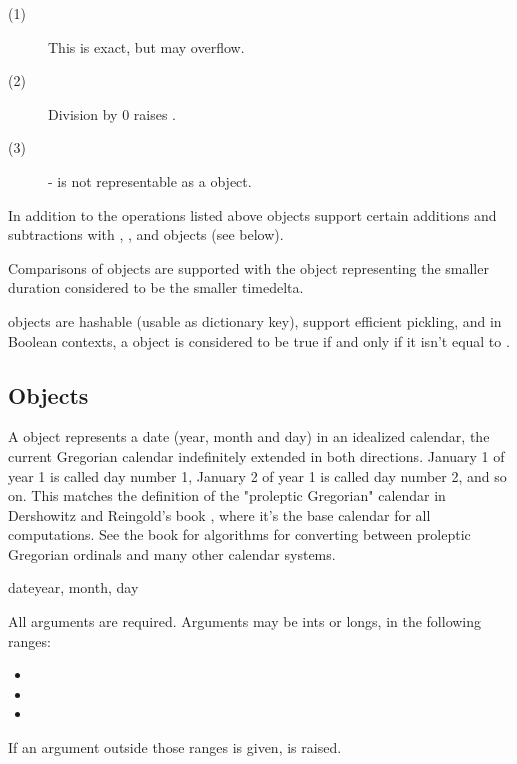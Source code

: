 \begin{description}
\item[(1)]
This is exact, but may overflow.

\item[(2)]
Division by 0 raises .

\item[(3)]
- is not representable as a  object.

\end{description}

In addition to the operations listed above  objects
support certain additions and subtractions with ,
, and  objects (see below).

Comparisons of  objects are supported with the
 object representing the smaller duration considered
to be the smaller timedelta.

 objects are hashable (usable as dictionary key),
support efficient pickling, and in Boolean contexts, a 
object is considered to be true if and only if it isn't equal to
.


\subsection{ Objects \label{datetime-date}}

A  object represents a date (year, month and day) in an idealized
calendar, the current Gregorian calendar indefinitely extended in both
directions.  January 1 of year 1 is called day number 1, January 2 of year
1 is called day number 2, and so on.  This matches the definition of the
"proleptic Gregorian" calendar in Dershowitz and Reingold's book
, where it's the base calendar for all
computations.  See the book for algorithms for converting between
proleptic Gregorian ordinals and many other calendar systems.

\begin{funcdesc}{date}{year, month, day}

    All arguments are required.  Arguments may be ints or longs, in the
    following ranges:

\begin{itemize}
  \item {}
  \item {}
  \item {}
\end{itemize}

If an argument outside those ranges is given, 
is raised.
\end{funcdesc}

